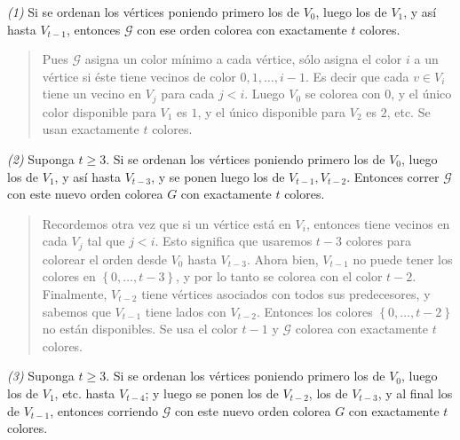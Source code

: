 \documentclass[a4paper]{article}
\begin{document}
\textit{(1)} Si se ordenan los vértices poniendo primero los de $V_0$, luego los
de $V_1$, y así hasta $V_{t-1}$, entonces $\mathscr{G}$ con ese orden colorea con
exactamente $t$ colores. 

\small
\begin{quote}
    Pues $\mathscr{G}$ asigna un color mínimo a cada vértice, sólo asigna el color $i$
    a un vértice si éste tiene vecinos de color $0, 1, \ldots, i -1$. Es decir
    que cada $v \in V_i$ tiene un vecino en $V_j$ para cada $j < i$. Luego $V_0$
    se colorea con $0$, y el único color disponible para $V_1$ es $1$, y el
    único disponible para $V_2$ es $2$, etc. Se usan exactamente $t$ colores.
\end{quote}


\textit{(2)} Suponga $t \geq 3$. Si se ordenan los vértices poniendo primero los
de $V_0$, luego los de $V_1$, y así hasta $V_{t - 3}$, y se ponen luego los de
$V_{t - 1}, V_{t-2}$. Entonces correr $\mathscr{G}$ con este nuevo orden colorea $G$
con exactamente $t$ colores.


\small
\begin{quote}

    Recordemos otra vez que si un vértice está en $V_i$, entonces tiene vecinos
    en cada $V_{j}$ tal que $j < i$. Esto significa que usaremos $t - 3$ colores
    para colorear el orden desde $V_0$ hasta $V_{t - 3}$. Ahora bien, $V_{t -
    1}$ no puede tener los colores en $\left\{ 0, \ldots, t - 3 \right\} $, y
    por lo tanto se colorea con el color $t - 2$. Finalmente, $V_{t - 2}$ tiene
    vértices asociados con todos sus predecesores, y sabemos que $V_{t - 1}$
    tiene lados con $V_{t - 2}$. Entonces los colores $\left\{ 0, \ldots, t - 2
    \right\} $ no están disponibles. Se usa el color $t - 1$ y $\mathscr{G}$ colorea
    con exactamente $t$ colores.

\end{quote}
\normalsize

\textit{(3)} Suponga $t \geq 3$. Si se ordenan los vértices poniendo primero los
de $V_0$, luego los de $V_1$, etc. hasta $V_{t - 4}$; y luego se ponen los de
$V_{t-2}$, los de $V_{t - 3}$, y al final los de $V_{t - 1}$, entonces corriendo
$\mathscr{G}$ con este nuevo orden colorea $G$ con exactamente $t$ colores.
\end{document}
